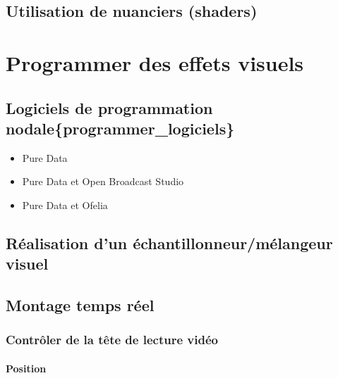 \documentclass[
]{book}
\providecommand{\tightlist}{%
  \setlength{\itemsep}{0pt}\setlength{\parskip}{0pt}}
\begin{document}
\hypertarget{utilisation-de-nuanciers-shaders}{%
\section{Utilisation de nuanciers (shaders)}\label{utilisation-de-nuanciers-shaders}}

\hypertarget{programmer}{%
\chapter{Programmer des effets visuels}\label{programmer}}

\hypertarget{logiciels-de-programmation-nodaleprogrammer_logiciels}{%
\section{Logiciels de programmation nodale\{programmer\_logiciels\}}\label{logiciels-de-programmation-nodaleprogrammer_logiciels}}

\begin{itemize}
\tightlist
\item
  Pure Data
\item
  Pure Data et Open Broadcast Studio
\item
  Pure Data et Ofelia
\end{itemize}

\hypertarget{ruxe9alisation-dun-uxe9chantillonneurmuxe9langeur-visuel}{%
\section{Réalisation d'un échantillonneur/mélangeur visuel}\label{ruxe9alisation-dun-uxe9chantillonneurmuxe9langeur-visuel}}

\hypertarget{montage-temps-ruxe9el}{%
\section{Montage temps réel}\label{montage-temps-ruxe9el}}

\hypertarget{contruxf4ler-de-la-tuxeate-de-lecture-viduxe9o}{%
\subsection{Contrôler de la tête de lecture vidéo}\label{contruxf4ler-de-la-tuxeate-de-lecture-viduxe9o}}

\hypertarget{position}{%
\subsubsection{Position}\label{position}}
\end{document}
